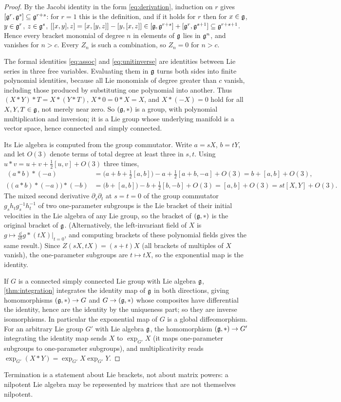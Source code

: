 \begin{proof}
By the Jacobi identity in the form \eqref{eq:derivation}, induction on $r$
gives $[\mathfrak{g}^r,\mathfrak{g}^s]\subseteq\mathfrak{g}^{r+s}$: for $r=1$ this is the definition,
and if it holds for $r$ then for $x\in\mathfrak{g}$, $y\in\mathfrak{g}^r$, $z\in\mathfrak{g}^s$,
$[[x,y],z]=[x,[y,z]]-[y,[x,z]]\in[\mathfrak{g},\mathfrak{g}^{r+s}]+[\mathfrak{g}^r,\mathfrak{g}^{s+1}]\subseteq\mathfrak{g}^{r+s+1}$.
Hence every bracket monomial of degree $n$ in elements of $\mathfrak{g}$ lies in
$\mathfrak{g}^n$, and vanishes for $n>c$. Every $Z_n$ is such a combination, so
$Z_n=0$ for $n>c$.

The formal identities \eqref{eq:assoc} and \eqref{eq:unitinverse} are
identities between Lie series in three free variables. Evaluating them in
$\mathfrak{g}$ turns both sides into finite polynomial identities, because all Lie
monomials of degree greater than $c$ vanish, including those produced by
substituting one polynomial into another. Thus
$(X*Y)*T=X*(Y*T)$, $X*0=0*X=X$, and $X*(-X)=0$ hold for all $X,Y,T\in\mathfrak{g}$,
not merely near zero. So $(\mathfrak{g},*)$ is a group, with polynomial multiplication
and inversion; it is a Lie group whose underlying manifold is a vector
space, hence connected and simply connected.

Its Lie algebra is computed from the group commutator. Write $a=sX$,
$b=tY$, and let $O(3)$ denote terms of total degree at least three in
$s,t$. Using $u*v=u+v+\frac12[u,v]+O(3)$ three times,
\begin{align*}
 (a*b)*(-a)&=\bigl(a+b+\tfrac12[a,b]\bigr)-a+\tfrac12[a+b,-a]+O(3)
 =b+[a,b]+O(3),\\
 \bigl((a*b)*(-a)\bigr)*(-b)&=\bigl(b+[a,b]\bigr)-b+\tfrac12[b,-b]+O(3)
 =[a,b]+O(3)=st[X,Y]+O(3).
\end{align*}
The mixed second derivative $\partial_s\partial_t$ at $s=t=0$ of the group
commutator $g_sh_tg_s^{-1}h_t^{-1}$ of two one-parameter subgroups is the
Lie bracket of their initial velocities in the Lie algebra of any Lie
group, so the bracket of $(\mathfrak{g},*)$ is the original bracket of $\mathfrak{g}$.
(Alternatively, the left-invariant field of $X$ is $g\mapsto\frac{\dd}{\dd t}
g*(tX)|_{t=0}$, and computing brackets of these polynomial fields gives the
same result.) Since $Z(sX,tX)=(s+t)X$ (all brackets of multiples of $X$
vanish), the one-parameter subgroups are $t\mapsto tX$, so the exponential
map is the identity.

If $G$ is a connected simply connected Lie group with Lie algebra $\mathfrak{g}$,
\cref{thm:integration} integrates the identity map of $\mathfrak{g}$ in both
directions, giving homomorphisms $(\mathfrak{g},*)\to G$ and $G\to(\mathfrak{g},*)$ whose
composites have differential the identity, hence are the identity by the
uniqueness part; so they are inverse isomorphisms. In particular the
exponential map of $G$ is a global diffeomorphism. For an arbitrary Lie
group $G'$ with Lie algebra $\mathfrak{g}$, the homomorphism $(\mathfrak{g},*)\to G'$
integrating the identity map sends $X$ to $\exp_{G'}X$ (it maps
one-parameter subgroups to one-parameter subgroups), and multiplicativity
reads $\exp_{G'}(X*Y)=\exp_{G'}X\exp_{G'}Y$.
\end{proof}
Termination is a statement about Lie brackets, not about matrix powers: a
nilpotent Lie algebra may be represented by matrices that are not
themselves nilpotent.

